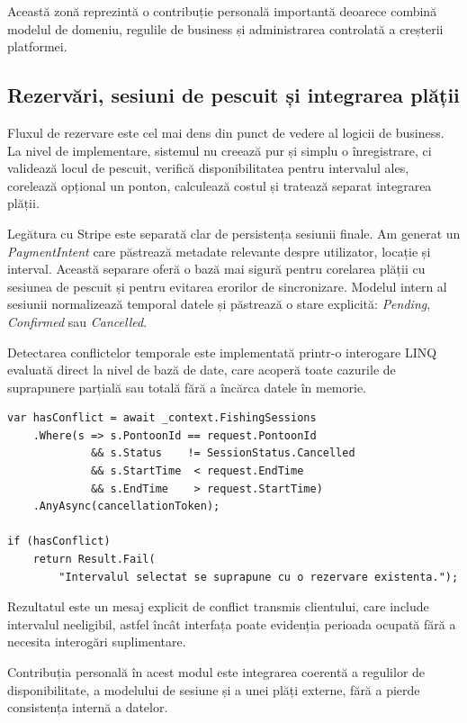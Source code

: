 Această zonă reprezintă o contribuție personală importantă deoarece combină modelul de domeniu, regulile de business și administrarea controlată a creșterii platformei.

\subsection{Rezervări, sesiuni de pescuit și integrarea plății}

Fluxul de rezervare este cel mai dens din punct de vedere al logicii de business. La nivel de implementare, sistemul nu creează pur și simplu o înregistrare, ci validează locul de pescuit, verifică disponibilitatea pentru intervalul ales, corelează opțional un ponton, calculează costul și tratează separat integrarea plății.

Legătura cu Stripe este separată clar de persistența sesiunii finale. Am generat un \emph{PaymentIntent} care păstrează metadate relevante despre utilizator, locație și interval. Această separare oferă o bază mai sigură pentru corelarea plății cu sesiunea de pescuit și pentru evitarea erorilor de sincronizare. Modelul intern al sesiunii normalizează temporal datele și păstrează o stare explicită: \emph{Pending}, \emph{Confirmed} sau \emph{Cancelled}.

Detectarea conflictelor temporale este implementată printr-o interogare LINQ evaluată direct la nivel de bază de date, care acoperă toate cazurile de suprapunere parțială sau totală fără a încărca datele în memorie.

\begin{lstlisting}[language={[Sharp]C}, caption={Interogarea LINQ pentru detectarea conflictelor de rezervare}]
var hasConflict = await _context.FishingSessions
    .Where(s => s.PontoonId == request.PontoonId
             && s.Status    != SessionStatus.Cancelled
             && s.StartTime  < request.EndTime
             && s.EndTime    > request.StartTime)
    .AnyAsync(cancellationToken);

if (hasConflict)
    return Result.Fail(
        "Intervalul selectat se suprapune cu o rezervare existenta.");
\end{lstlisting}

Rezultatul este un mesaj explicit de conflict transmis clientului, care include intervalul neeligibil, astfel încât interfața poate evidenția perioada ocupată fără a necesita interogări suplimentare.

Contribuția personală în acest modul este integrarea coerentă a regulilor de disponibilitate, a modelului de sesiune și a unei plăți externe, fără a pierde consistența internă a datelor.

